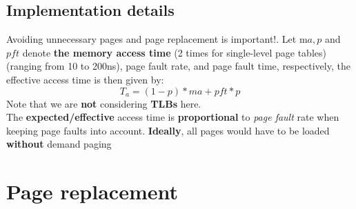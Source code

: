 \documentclass{article}
\begin{document}
\subsection{Implementation details}
\begin{flushleft}
Avoiding unnecessary pages and page replacement is important!. Let m$a, p$ and $pft$ denote \textbf{the memory access time} (2 times for single-level page tables) (ranging from 10 to 200ns), page fault rate, and page fault time, respectively, the effective access time is then given by:
\[ T_{a} = (1 - p) * ma+pft * p \]
Note that we are \textbf{not} considering \textbf{TLBs} here.\\
The \textbf{expected/effective} access time is \textbf{proportional} to \textit{page fault} rate when keeping page faults into account. \textbf{Ideally}, all pages would have to be loaded \textbf{without} demand paging
\end{flushleft}

\section{Page replacement}
\end{document}

